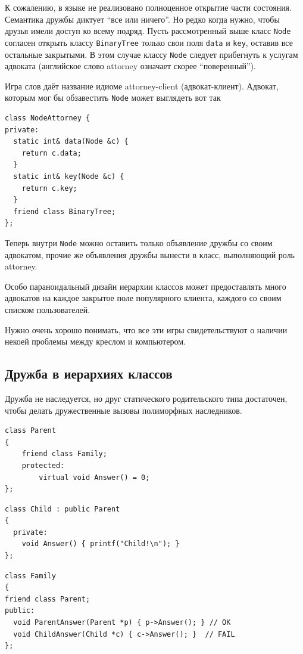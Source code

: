 \documentclass[a4paper,12pt,oneside]{book}
\begin{document}
К сожалению, в языке не реализовано полноценное открытие части состояния. Семантика дружбы диктует ``все или ничего''. Но редко когда нужно, чтобы друзья имели доступ ко всему подряд. Пусть рассмотренный выше класс \lstinline!Node! согласен открыть классу \lstinline!BinaryTree! только свои поля \lstinline!data! и \lstinline!key!, оставив все остальные закрытыми. В этом случае классу \lstinline!Node! следует прибегнуть к услугам адвоката (английское слово attorney означает скорее ``поверенный'').

Игра слов даёт название идиоме attorney-client (адвокат-клиент). Адвокат, которым мог бы обзавестить \lstinline!Node! может выглядеть вот так

\begin{lstlisting}
class NodeAttorney {
private:
  static int& data(Node &c) {
    return c.data;
  } 
  static int& key(Node &c) {
    return c.key;
  } 
  friend class BinaryTree;
};
\end{lstlisting}

Теперь внутри \lstinline!Node! можно оставить только объявление дружбы со своим адвокатом, прочие же объявления дружбы вынести в класс, выполняющий роль attorney.

Особо параноидальный дизайн иерархии классов может предоставлять много адвокатов на каждое закрытое поле популярного клиента, каждого со своим списком пользователей.

Нужно очень хорошо понимать, что все эти игры свидетельствуют о наличии некоей проблемы между креслом и компьютером.

\subsection{Дружба в иерархиях классов}

Дружба не наследуется, но друг статического родительского типа достаточен, чтобы делать дружественные вызовы полиморфных наследников.

\begin{lstlisting}
class Parent
{
    friend class Family;
    protected:
        virtual void Answer() = 0;
};
\end{lstlisting}

\begin{lstlisting}
class Child : public Parent
{
  private:
    void Answer() { printf("Child!\n"); }
};
\end{lstlisting}

\begin{lstlisting}
class Family
{
friend class Parent;
public:
  void ParentAnswer(Parent *p) { p->Answer(); } // OK
  void ChildAnswer(Child *c) { c->Answer(); }  // FAIL
};
\end{lstlisting}
\end{document}
